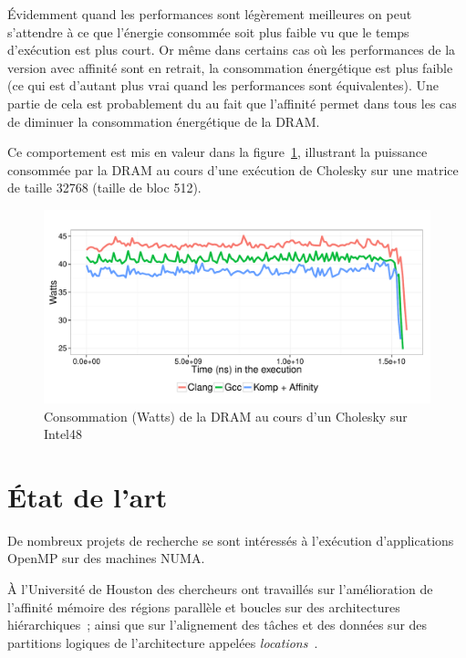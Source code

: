 \documentclass[parallelisme]{compas2017}
\begin{document}
Évidemment quand les performances sont légèrement meilleures on peut s'attendre
à ce que l'énergie consommée soit plus faible vu que le temps d'exécution est
plus court.
Or même dans certains cas où les performances de la version avec affinité sont
en retrait, la consommation énergétique est plus faible (ce qui est d'autant plus
vrai quand les performances sont équivalentes).
Une partie de cela est probablement du au fait que l'affinité permet dans tous les
cas de diminuer la consommation énergétique de la DRAM.

Ce comportement est mis en valeur dans la figure~\ref{fig:eval-dram-cholesky},
illustrant la puissance consommée par la DRAM au cours d'une exécution
de Cholesky sur une matrice de taille 32768 (taille de bloc 512).


\begin{figure}[t]
  \centering
  \includegraphics[scale=0.5]{./graphs/graph_energy_dram_dpotrf.pdf}
  \caption{Consommation (Watts) de la DRAM au cours d'un Cholesky sur Intel48}
\label{fig:eval-dram-cholesky}
\end{figure}



\section{État de l'art}
\label{sec:related-work}

De nombreux projets de recherche se sont intéressés à l'exécution d'applications
OpenMP sur des machines NUMA.  

À l'Université de Houston des chercheurs ont travaillés sur l'amélioration de l'affinité mémoire des
régions parallèle et boucles sur des architectures
hiérarchiques~\cite{Marowka:2004:OAD:1064428.1064431}; ainsi que sur l'alignement
des tâches et des données sur des partitions logiques de
l'architecture appelées \textit{locations}~\cite{Huang-Chapman-locality-OpenMP}.
\end{document}

